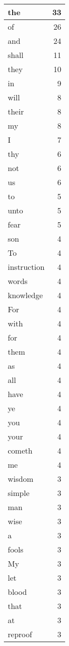 \begin{center}
\begin{longtable}{l|r}
the & 33\\ \hline 
of & 26\\ \hline 
and & 24\\ \hline 
shall & 11\\ \hline 
they & 10\\ \hline 
in & 9\\ \hline 
will & 8\\ \hline 
their & 8\\ \hline 
my & 8\\ \hline 
I & 7\\ \hline 
thy & 6\\ \hline 
not & 6\\ \hline 
us & 6\\ \hline 
to & 5\\ \hline 
unto & 5\\ \hline 
fear & 5\\ \hline 
son & 4\\ \hline 
To & 4\\ \hline 
instruction & 4\\ \hline 
words & 4\\ \hline 
knowledge & 4\\ \hline 
For & 4\\ \hline 
with & 4\\ \hline 
for & 4\\ \hline 
them & 4\\ \hline 
as & 4\\ \hline 
all & 4\\ \hline 
have & 4\\ \hline 
ye & 4\\ \hline 
you & 4\\ \hline 
your & 4\\ \hline 
cometh & 4\\ \hline 
me & 4\\ \hline 
wisdom & 3\\ \hline 
simple & 3\\ \hline 
man & 3\\ \hline 
wise & 3\\ \hline 
a & 3\\ \hline 
fools & 3\\ \hline 
My & 3\\ \hline 
let & 3\\ \hline 
blood & 3\\ \hline 
that & 3\\ \hline 
at & 3\\ \hline 
reproof & 3\\ \hline 

\end{longtable}
\end{center}
